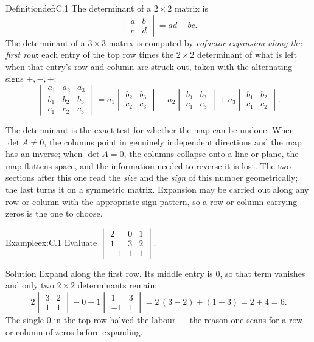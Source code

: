\documentclass[a4paper,12pt,oneside]{memoir}
\begin{document}
\begin{envdefinition}{Definition}{def:C.1}{}
The determinant of a \(2\times 2\) matrix is \[ \begin{vmatrix} a & b \\ c & d \end{vmatrix} = ad - bc. \] The determinant of a \(3\times 3\) matrix is computed by \emph{cofactor expansion along the first row}: each entry of the top row times the \(2\times 2\) determinant of what is left when that entry’s row and column are struck out, taken with the alternating signs \(+, -, +\): \[ \begin{vmatrix} a_1 & a_2 & a_3 \\ b_1 & b_2 & b_3 \\ c_1 & c_2 & c_3 \end{vmatrix} = a_1\begin{vmatrix} b_2 & b_3 \\ c_2 & c_3 \end{vmatrix} - a_2\begin{vmatrix} b_1 & b_3 \\ c_1 & c_3 \end{vmatrix} + a_3\begin{vmatrix} b_1 & b_2 \\ c_1 & c_2 \end{vmatrix}. \]
\end{envdefinition}
The determinant is the exact test for whether the map can be undone. When \(\det A \neq 0\), the columns point in genuinely independent directions and the map has an inverse; when \(\det A = 0\), the columns collapse onto a line or plane, the map flattens space, and the information needed to reverse it is lost. The two sections after this one read the \emph{size} and the \emph{sign} of this number geometrically; the last turns it on a symmetric matrix. Expansion may be carried out along any row or column with the appropriate sign pattern, so a row or column carrying zeros is the one to choose.

\begin{workedexample}
\begin{envexample}{Example}{ex:C.1}{}
Evaluate \(\begin{vmatrix} 2 & 0 & 1 \\ 1 & 3 & 2 \\ -1 & 1 & 1 \end{vmatrix}\).
\end{envexample}
\begin{envsolution}{Solution}{}{}
Expand along the first row. Its middle entry is \(0\), so that term vanishes and only two \(2\times 2\) determinants remain: \[ 2\begin{vmatrix} 3 & 2 \\ 1 & 1 \end{vmatrix} - 0 + 1\begin{vmatrix} 1 & 3 \\ -1 & 1 \end{vmatrix} = 2\,(3 - 2) + (1 + 3) = 2 + 4 = 6. \] The single \(0\) in the top row halved the labour — the reason one scans for a row or column of zeros before expanding.
\end{envsolution}
\end{workedexample}
\end{document}
